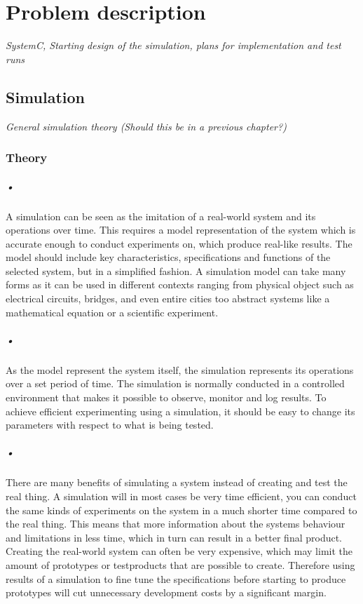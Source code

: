 \documentclass[a4paper]{report}
\begin{document}
\chapter{Problem description}
\textit{SystemC, Starting design of the simulation, plans for implementation and test runs}

\section{Simulation}
\textit{General simulation theory (Should this be in a previous chapter?)}

\subsection{Theory}
\paragraph{•}
A simulation can be seen as the imitation of a real-world system and its operations over time.
This requires a model representation of the system which is accurate enough to conduct experiments on, which produce real-like results.
The model should include key characteristics, specifications and functions of the selected system, but in a simplified fashion.
A simulation model can take many forms as it can be used in different contexts ranging from physical object such as electrical circuits, bridges, and even entire cities too abstract systems like a mathematical equation or a scientific experiment. %

\paragraph{•} 
As the model represent the system itself, the simulation represents its operations over a set period of time.
The simulation is normally conducted in a controlled environment that makes it possible to observe, monitor and log results.
To achieve efficient experimenting using a simulation, it should be easy to change its parameters with respect to what is being tested.

\paragraph{•}
There are many benefits of simulating a system instead of creating and test the real thing.
A simulation will in most cases be very time efficient, you can conduct the same kinds of experiments on the system in a much shorter time compared to the real thing.
This means that more information about the systems behaviour and limitations in less time, which in turn can result in a better final product.
Creating the real-world system can often be very expensive, which may limit the amount of prototypes or testproducts that are possible to create.
Therefore using results of a simulation to fine tune the specifications before starting to produce prototypes will cut unnecessary development costs by a significant margin.
\end{document}
